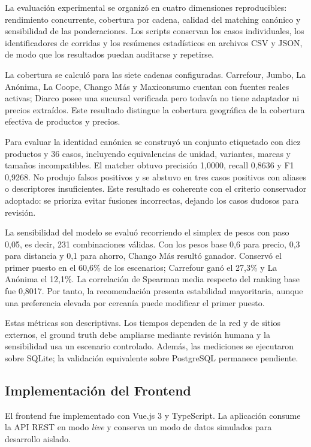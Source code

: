 La evaluación experimental se organizó en cuatro dimensiones reproducibles:
rendimiento concurrente, cobertura por cadena, calidad del matching canónico y
sensibilidad de las ponderaciones. Los scripts conservan los casos individuales,
los identificadores de corridas y los resúmenes estadísticos en archivos CSV y
JSON, de modo que los resultados puedan auditarse y repetirse.

La cobertura se calculó para las siete cadenas configuradas. Carrefour, Jumbo,
La Anónima, La Coope, Chango Más y Maxiconsumo cuentan con fuentes reales activas;
Diarco posee una sucursal verificada pero
todavía no tiene adaptador ni precios extraídos. Este resultado distingue
la cobertura geográfica de la cobertura efectiva de productos y precios.

Para evaluar la identidad canónica se construyó un conjunto etiquetado con diez
productos y 36 casos, incluyendo equivalencias de unidad, variantes, marcas y
tamaños incompatibles. El matcher obtuvo precisión 1,0000, recall 0,8636 y F1
0,9268. No produjo falsos positivos y se abstuvo en tres casos positivos con
aliases o descriptores insuficientes. Este resultado es coherente con el criterio
conservador adoptado: se prioriza evitar fusiones incorrectas, dejando los casos
dudosos para revisión.

La sensibilidad del modelo se evaluó recorriendo el simplex de pesos con paso
0,05, es decir, 231 combinaciones válidas. Con los pesos base 0,6 para precio,
0,3 para distancia y 0,1 para ahorro, Chango Más resultó ganador. Conservó el
primer puesto en el 60,6\% de los escenarios; Carrefour ganó el 27,3\% y La
Anónima el 12,1\%. La correlación de Spearman media respecto del ranking base fue
0,8017. Por tanto, la recomendación presenta estabilidad mayoritaria, aunque una
preferencia elevada por cercanía puede modificar el primer puesto.

Estas métricas son descriptivas. Los tiempos dependen de la red y de sitios
externos, el ground truth debe ampliarse mediante revisión humana y la sensibilidad
usa un escenario controlado. Además, las mediciones se ejecutaron sobre SQLite;
la validación equivalente sobre PostgreSQL permanece pendiente.

\subsection{Implementación del Frontend}

El frontend fue implementado con Vue.js 3 y TypeScript. La aplicación consume
la API REST en modo \textit{live} y conserva un modo de datos simulados para
desarrollo aislado.

